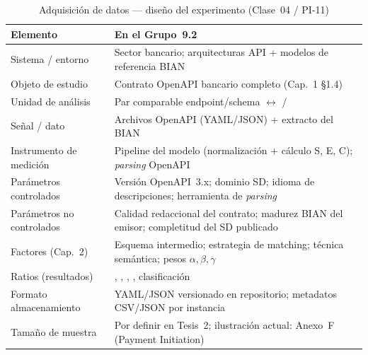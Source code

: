 \begin{table}[H]
  \centering
  \caption{Adquisición de datos --- diseño del experimento (Clase~04 / PI-11)}
  \label{tab:adquisicion-datos}
  \small
  \begin{tabular}{@{}p{}p{}@{}}
    \toprule
    \textbf{Elemento} & \textbf{En el Grupo~9.2} \\
    \midrule
    Sistema / entorno &
    Sector bancario; arquitecturas API + modelos de referencia BIAN \\
    Objeto de estudio &
    Contrato OpenAPI bancario completo (Cap.~1 §1.4) \\
    Unidad de análisis &
    Par comparable endpoint/\allowbreak schema $\leftrightarrow$ \Behavior{}/\BusinessObject{} \\
    Señal / dato &
    Archivos OpenAPI (YAML/JSON) + extracto del \ServiceDomain{} BIAN \\
    Instrumento de medición &
    Pipeline del modelo (normalización + cálculo S, E, C); \textit{parsing} OpenAPI \\
    Parámetros controlados &
    Versión OpenAPI~3.x; dominio SD; idioma de descripciones; herramienta de \textit{parsing} \\
    Parámetros no controlados &
    Calidad redaccional del contrato; madurez BIAN del emisor; completitud del SD publicado \\
    Factores (Cap.~2) &
    Esquema intermedio; estrategia de matching; técnica semántica; pesos $\alpha,\beta,\gamma$ \\
    Ratios (resultados) &
    \StructuralScore{}, \SemanticScore{}, \CoverageScore{}, \AlignmentScore{}, clasificación \\
    Formato almacenamiento &
    YAML/JSON versionado en repositorio; metadatos CSV/JSON por instancia \\
    Tamaño de muestra &
    Por definir en Tesis~2; ilustración actual: Anexo~F (Payment Initiation) \\
    \bottomrule
  \end{tabular}
\end{table}
